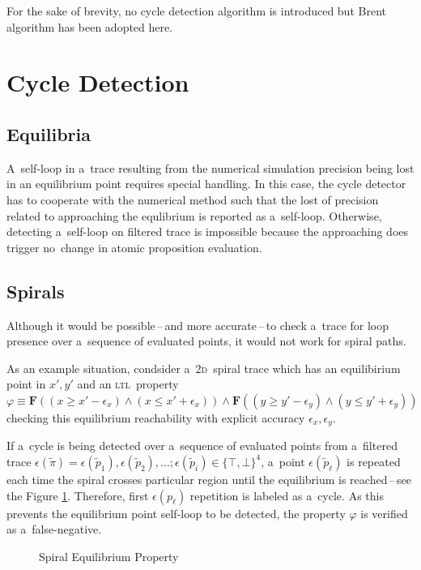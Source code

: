 \documentclass[12pt,twoside,draft]{fithesis}
\newcommand{\ltl}{\textsc{ltl}~}
\newcommand{\bF}{\mathbf{F}}
\begin{document}
For the sake of brevity, no cycle detection algorithm is introduced
but Brent algorithm\cite{wloop,brent} has been adopted here.

\section{Cycle Detection}
\subsection*{Equilibria}
A~self-loop in a~trace resulting from the numerical simulation precision
being lost in an equilibrium point requires special handling. In this
case, the cycle detector has to cooperate with the numerical method such
that the lost of precision related to approaching the equlibrium is
reported as a~self-loop. Otherwise, detecting a~self-loop on filtered
trace is impossible because the approaching does trigger no~change in
atomic proposition evaluation.

\subsection*{Spirals}
Although it would be possible\,--\,and more accurate\,--\,to check
a~trace for loop presence over a~sequence of evaluated points,
it would not work for spiral paths.

As an example situation, condsider
a~\textsc{2d}~spiral trace which has an equilibirium point in $x',y'$
and an \ltl property
$\varphi\equiv\bF((x\ge x'-\epsilon_x)\wedge(x\le x'+\epsilon_x))\wedge
\bF((y\ge y'-\epsilon_y)\wedge(y\le y'+\epsilon_y))$ checking this
equilibrium reachability with explicit accuracy
$\epsilon_x,\epsilon_y$.

If a~cycle is being detected over a~sequence of evaluated points
from a~filtered trace
$\epsilon(\tilde{\pi})=\epsilon(\tilde{p}_1),\epsilon(\tilde{p}_2),
\dotsc; \epsilon(\tilde{p}_i)\in\{\top,\bot\}^4$, a~point
$\epsilon(\tilde{p}_{\ell})$ is repeated each time the spiral crosses
particular region until the equilibrium is reached\,--\,see the Figure
\ref{spiral}. Therefore, first $\epsilon(p_{\ell})$ repetition is
labeled as a~cycle. As this prevents the equilibrium point self-loop to
be detected, the property $\varphi$ is verified as a~false-negative.
\begin{figure}

\caption{Spiral Equilibrium Property}
\label{spiral}
\end{figure}
\end{document}
